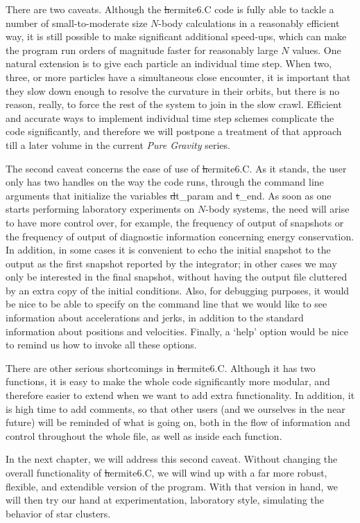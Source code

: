 There are two caveats.  Although the {\st hermite6.C} code is fully able
to tackle a number of small-to-moderate size $N$-body calculations in a
reasonably efficient way, it is still possible to make significant
additional speed-ups, which can make the program run orders of
magnitude faster for reasonably large $N$ values.  One natural
extension is to give each particle an individual time step.  When two,
three, or more particles have a simultaneous close encounter, it is
important that they slow down enough to resolve the curvature in their
orbits, but there is no reason, really, to force the rest of the
system to join in the slow crawl.  Efficient and accurate ways to
implement individual time step schemes complicate the code
significantly, and therefore we will postpone a treatment of that
approach till a later volume in the current {\it Pure Gravity} series.

The second caveat concerns the ease of use of {\st hermite6.C}.
As it stands, the user only has two handles on the way the code runs,
through the command line arguments that initialize the variables
{\st dt\_param} and {\st t\_end}.  As soon as one starts performing
laboratory experiments on $N$-body systems, the need will arise to have
more control over, for example, the frequency of output of snapshots
or the frequency of output of diagnostic information concerning energy
conservation.  In addition, in some cases it is convenient to echo the
initial snapshot to the output as the first snapshot reported by the
integrator; in other cases we may only be interested in the final
snapshot, without having the output file cluttered by an extra copy of
the initial conditions.  Also, for debugging purposes, it would be
nice to be able to specify on the command line that we would like to
see information about accelerations and jerks, in addition to the
standard information about positions and velocities.  Finally, a `help'
option would be nice to remind us how to invoke all these options.

There are other serious shortcomings in {\st hermite6.C}.  Although it
has two functions, it is easy to make the whole code significantly
more modular, and therefore easier to extend when we want to add extra
functionality.  In addition, it is high time to add comments, so that
other users (and we ourselves in the near future) will be reminded of
what is going on, both in the flow of information and control throughout
the whole file, as well as inside each function.

In the next chapter, we will address this second caveat.  Without
changing the overall functionality of {\st hermite6.C}, we will wind
up with a far more robust, flexible, and extendible version of the
program.  With that version in hand, we will then try our hand at
experimentation, laboratory style, simulating the behavior of star
clusters.
